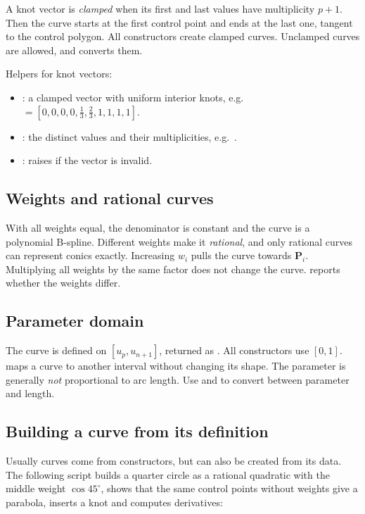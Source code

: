 A knot vector is \emph{clamped} when its first and last values have multiplicity $p+1$. Then the
curve starts at the first control point and ends at the last one, tangent to the control
polygon. All constructors create clamped curves. Unclamped curves are allowed, and
 converts them.

Helpers for knot vectors:
\begin{itemize}
  \item {} : a clamped vector with uniform
    interior knots, e.g.\  $=[0,0,0,0,\frac13,\frac23,1,1,1,1]$.
  \item {} : the distinct values and their multiplicities,
    e.g.\ \code{([0.0, 0.5, 1.0], [3, 2, 3])}.
  \item {} : raises
     if the vector is invalid.
\end{itemize}

\subsection{Weights and rational curves}
With all weights equal, the denominator is constant and the curve is a polynomial B-spline.
Different weights make it \emph{rational}, and only rational curves can represent conics
exactly. Increasing $w_i$ pulls the curve towards $\mathbf P_i$. Multiplying all weights by
the same factor does not change the curve.  reports whether the weights
differ.

\subsection{Parameter domain}
The curve is defined on $[u_p, u_{n+1}]$, returned as . All constructors use
$[0,1]$.  maps a curve to another interval without changing its shape.
The parameter is generally \emph{not} proportional to arc length. Use 
and  to convert between parameter and length.

\subsection{Building a curve from its definition}
Usually curves come from constructors, but  can also be created from its
data. The following script builds a quarter circle as a rational quadratic with the middle
weight $\cos 45^\circ$, shows that the same control points without weights give a parabola,
inserts a knot and computes derivatives:

